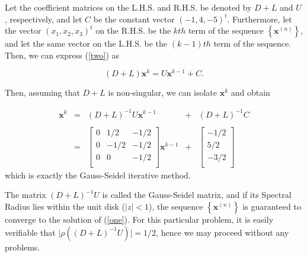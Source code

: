 \documentclass[a4paper, 12pt, twoside]{article}
\begin{document}
Let the coefficient matrices on the L.H.S. and R.H.S. be denoted by $D+L$ and $U$, respectively, and let $C$ be the constant vector $(-1,4,-5)^t$. Furthermore, let the vector $(x_1, x_2, x_3)^t$ on the R.H.S. be the $kth$ term of the sequence $\left\lbrace \textbf{x}^{(n)} \right\rbrace$, and let the same vector on the L.H.S. be  the $(k-1)th$ term of the sequence. Then, we can express (\ref{two}) as

$$(D+L)\textbf{x}^{k} = U\textbf{x}^{k-1} +C.$$

Then, assuming that $D+L$ is non-singular, we can isolate $\textbf{x}^{k}$ and obtain

$$
\begin{array}{rrrrr}
\textbf{x}^{k}& = &(D+L)^{-1}U\textbf{x}^{k-1}& +&(D+L)^{-1}C\\
\\
&=&\begin{bmatrix}
0&1/2& -1/2\\
0&-1/2&-1/2\\
0&0&-1/2\\
\end{bmatrix}
\textbf{x}^{k-1}
&+&
\begin{bmatrix}
-1/2\\5/2\\-3/2\\
\end{bmatrix}
\end{array}
$$
which is exactly the Gauss-Seidel iterative method. 

The matrix $(D+L)^{-1}U$ is called the Gauss-Seidel matrix, and if its Spectral Radius lies within the unit disk ($\lvert z \rvert < 1$), the sequence $\left\lbrace \textbf{x}^{(n)} \right\rbrace$ is guaranteed to converge to the solution of (\ref{one}). For this particular problem, it is easily verifiable that $\lvert\rho((D+L)^{-1}U)\rvert = 1/2$, hence we may proceed without any problems.
\newpage
\end{document}
